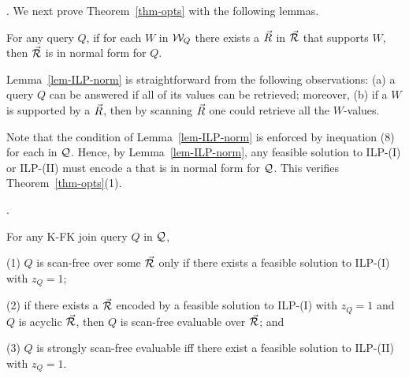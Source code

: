 \vspace{-0.4ex}

. We next prove Theorem~\ref{thm-opts} with the following lemmas. 



\begin{lemma}\label{lem-ILP-norm}
  For any \SQL query $Q$, if for each \qcs $W$ in $\mathcal{W}_{Q}$ there
  exists a \bs $\vec{R}$ in $\vec{{\mathcal R}}$ that supports $W$, then
  $\vec{{\mathcal R}}$ is in  normal form for $Q$. 
\end{lemma}

Lemma~\ref{lem-ILP-norm} is straightforward from the following observations:
(a) a query $Q$ can be answered if all of its \qcs values can be
retrieved; moreover,
(b) if a \qcs $W$ is supported by a \bs $\vec{R}$, then by scanning
$\vec{R}$ one could retrieve all the $W$-values. 

Note that the condition of Lemma~\ref{lem-ILP-norm} is enforced
by inequation (8) for each  in $\mathcal Q$.
Hence, by Lemma~\ref{lem-ILP-norm}, any feasible solution to ILP-(I)
or ILP-(II) must encode a \bds that is in  normal form for $\mathcal Q$.
This verifies Theorem~\ref{thm-opts}(1). 


\vspace{1ex}
.

\vspace{-0.5ex}
\begin{lemma}\label{lem-ILP}
  For any K-FK join \SPC query $Q$ in $\mathcal Q$, 

  \sstab (1) $Q$ is scan-free over some \bds $\vec{{\mathcal R}}$ only if there exists a feasible
  solution to ILP-(I) with $z_{Q} = 1$; 

  \sstab (2) if there exists a \bds $\vec{{\mathcal R}}$ encoded by a feasible
  solution to ILP-(I) with $z_{Q} = 1$ and $Q$ is acyclic \wrt
  $\vec{{\mathcal R}}$, then $Q$ is scan-free evaluable over $\vec{{\mathcal R}}$; and

  \sstab (3) $Q$ is strongly scan-free evaluable iff there exist a
  feasible solution to ILP-(II) with $z_{Q} = 1$. 
\end{lemma}

\vspace{-0.7ex}



